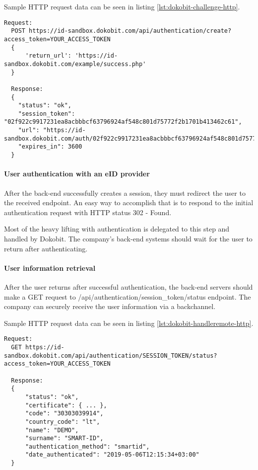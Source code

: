 Sample HTTP request data can be seen in listing \ref{lst:dokobit-challenge-http}.

\begin{lstlisting}[caption={Handling Dokobit session creation}, label={lst:dokobit-challenge-http}]
  Request:
  POST https://id-sandbox.dokobit.com/api/authentication/create?access_token=YOUR_ACCESS_TOKEN
  {
      'return_url': 'https://id-sandbox.dokobit.com/example/success.php'
  }
  
  Response:
  {
    "status": "ok",
    "session_token": "02f922c9917231ea8acbbbcf63796924af548c801d75772f2b1701b413462c61",
    "url": "https://id-sandbox.dokobit.com/auth/02f922c9917231ea8acbbbcf63796924af548c801d75772f2b1701b413462c61",
    "expires_in": 3600
  }
\end{lstlisting}

\paragraph{User authentication with an eID provider}

After the back-end successfully creates a session, they must redirect the user to the received endpoint. An easy way to accomplish that is to respond to the initial authentication request with HTTP status 302 - Found.

Most of the heavy lifting with authentication is delegated to this step and handled by Dokobit. The company's back-end systems should wait for the user to return after authenticating.

\paragraph{User information retrieval}

After the user returns after successful authentication, the back-end servers should make a {GET} request to {/api/authentication/session\_token/status} endpoint. The company can securely receive the user information via a backchannel.

Sample HTTP request data can be seen in listing \ref{lst:dokobit-handleremote-http}.

\begin{lstlisting}[caption={Handling Dokobit session creation}, label={lst:dokobit-handleremote-http}]
  Request:
  GET https://id-sandbox.dokobit.com/api/authentication/SESSION_TOKEN/status?access_token=YOUR_ACCESS_TOKEN
  
  Response:
  {
      "status": "ok",
      "certificate": { ... },
      "code": "30303039914",
      "country_code": "lt",
      "name": "DEMO",
      "surname": "SMART-ID",
      "authentication_method": "smartid",
      "date_authenticated": "2019-05-06T12:15:34+03:00"
  }
\end{lstlisting}

